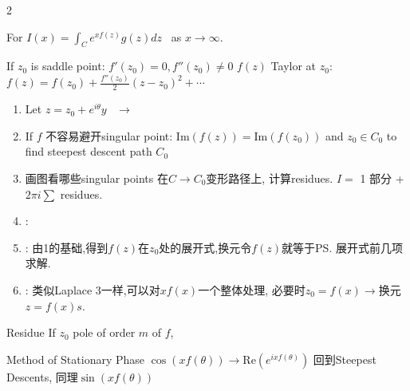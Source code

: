\documentclass{note}
\begin{document}
\begin{multicols}{2}
{{    \begin{MyTh}{}\tiny
        For $I(x)=\int_{C}e^{xf(z)}g(z)dz$ \ as $x\to\infty$. \quad {}
        
        \vspace{-3pt}
        \quad If $z_0$ is saddle point: $f'(z_0)=0, f''(z_0)\neq0$ \quad $f(z)$ Taylor at $z_0$: $f(z)=f(z_0)+\frac{f''(z_0)}{2}(z-z_0)^2+\cdots$

        \vspace{-2pt}
        \begin{enumerate}
            \item Let $z=z_0+e^{i\theta}y$  \ $\to$ \ 
            \item If $f$ 不容易避开singular point: $\mathrm{Im}(f(z))=\mathrm{Im}(f(z_0))$ and $z_0\in C_0$ to find steepest descent path $C_0$
            \item {} 画图看哪些singular points 在$C\to C_0$变形路径上, 计算residues. \quad {} $I=$ 1 部分 + $2\pi i\sum$ residues.
            \item {}:  \\
            \item {}: 由1的基础,得到$f(z)$在$z_0$处的展开式,换元令$f(z)$就等于\ps{展开式前几项求解}.
            \item {}: 类似Laplace 3一样,可以对$xf(x)$一个整体处理, 必要时$z_0=f(x)\to$换元$z=f(x)s$.
        \end{enumerate}
    \end{MyTh}

    \begin{MyTh}{Residue}\tiny 
        If $z_0$ pole of order $m$ of $f$, 
    \end{MyTh}

    \vspace{-2pt}
    \begin{MyTh}{Method of Stationary Phase}\tiny
        $\cos(xf(\theta))\to\mathrm{Re}(e^{ixf(\theta)})$ 回到Steepest Descents, 同理$\sin(xf(\theta))$
    \end{MyTh}

}}
\end{multicols}
\end{document}
